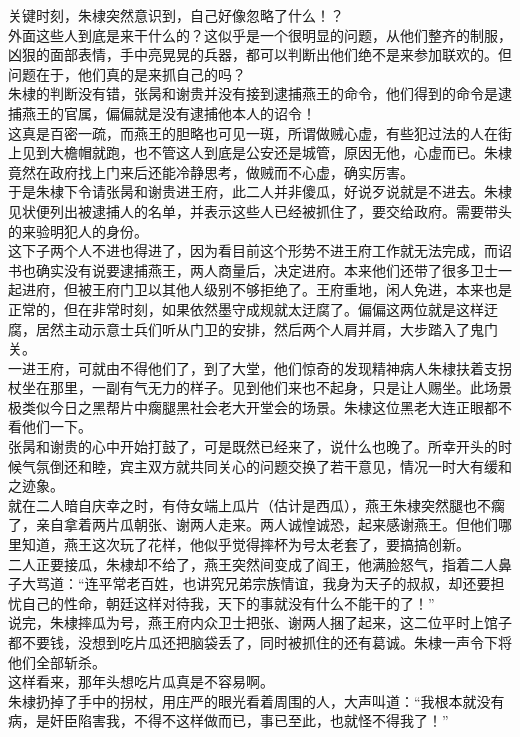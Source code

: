 \begin{multicols}{\theparacolNo}
关键时刻，朱棣突然意识到，自己好像忽略了什么！？\\

外面这些人到底是来干什么的？这似乎是一个很明显的问题，从他们整齐的制服，凶狠的面部表情，手中亮晃晃的兵器，都可以判断出他们绝不是来参加联欢的。但问题在于，他们真的是来抓自己的吗？\\

朱棣的判断没有错，张昺和谢贵并没有接到逮捕燕王的命令，他们得到的命令是逮捕燕王的官属，偏偏就是没有逮捕他本人的诏令！\\

这真是百密一疏，而燕王的胆略也可见一斑，所谓做贼心虚，有些犯过法的人在街上见到大檐帽就跑，也不管这人到底是公安还是城管，原因无他，心虚而已。朱棣竟然在政府找上门来后还能冷静思考，做贼而不心虚，确实厉害。\\

于是朱棣下令请张昺和谢贵进王府，此二人并非傻瓜，好说歹说就是不进去。朱棣见状便列出被逮捕人的名单，并表示这些人已经被抓住了，要交给政府。需要带头的来验明犯人的身份。\\

这下子两个人不进也得进了，因为看目前这个形势不进王府工作就无法完成，而诏书也确实没有说要逮捕燕王，两人商量后，决定进府。本来他们还带了很多卫士一起进府，但被王府门卫以其他人级别不够拒绝了。王府重地，闲人免进，本来也是正常的，但在非常时刻，如果依然墨守成规就太迂腐了。偏偏这两位就是这样迂腐，居然主动示意士兵们听从门卫的安排，然后两个人肩并肩，大步踏入了鬼门关。\\

一进王府，可就由不得他们了，到了大堂，他们惊奇的发现精神病人朱棣扶着支拐杖坐在那里，一副有气无力的样子。见到他们来也不起身，只是让人赐坐。此场景极类似今日之黑帮片中瘸腿黑社会老大开堂会的场景。朱棣这位黑老大连正眼都不看他们一下。\\

张昺和谢贵的心中开始打鼓了，可是既然已经来了，说什么也晚了。所幸开头的时候气氛倒还和睦，宾主双方就共同关心的问题交换了若干意见，情况一时大有缓和之迹象。\\

就在二人暗自庆幸之时，有侍女端上瓜片（估计是西瓜），燕王朱棣突然腿也不瘸了，亲自拿着两片瓜朝张、谢两人走来。两人诚惶诚恐，起来感谢燕王。但他们哪里知道，燕王这次玩了花样，他似乎觉得摔杯为号太老套了，要搞搞创新。\\

二人正要接瓜，朱棣却不给了，燕王突然间变成了阎王，他满脸怒气，指着二人鼻子大骂道：“连平常老百姓，也讲究兄弟宗族情谊，我身为天子的叔叔，却还要担忧自己的性命，朝廷这样对待我，天下的事就没有什么不能干的了！”\\

说完，朱棣摔瓜为号，燕王府内众卫士把张、谢两人捆了起来，这二位平时上馆子都不要钱，没想到吃片瓜还把脑袋丢了，同时被抓住的还有葛诚。朱棣一声令下将他们全部斩杀。\\

这样看来，那年头想吃片瓜真是不容易啊。\\

朱棣扔掉了手中的拐杖，用庄严的眼光看着周围的人，大声叫道：“我根本就没有病，是奸臣陷害我，不得不这样做而已，事已至此，也就怪不得我了！”\\
\ifnum{}
	\end{multicols}
\fi
\newpage
